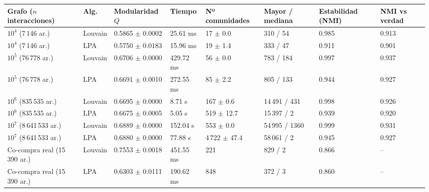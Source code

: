\setlength{\tabcolsep}{4pt}
\begin{tabular}{@{}llllllll@{}}\toprule
Grafo ($n$ interacciones) & Alg. & Modularidad $Q$ & Tiempo & Nº comunidades & Mayor / mediana & Estabilidad (NMI) & NMI vs verdad \\\midrule
$10^4$ (7\,146 ar.) & Louvain & 0.5865 $\pm$ 0.0002 & 25.61 ms & 17 $\pm$ 0.0 & 310 / 54 & 0.985 & 0.913 \\
$10^4$ (7\,146 ar.) & LPA & 0.5750 $\pm$ 0.0183 & 15.96 ms & 19 $\pm$ 1.4 & 333 / 47 & 0.911 & 0.901 \\
$10^5$ (76\,778 ar.) & Louvain & 0.6706 $\pm$ 0.0000 & 429.72 ms & 56 $\pm$ 0.0 & 783 / 184 & 0.997 & 0.937 \\
$10^5$ (76\,778 ar.) & LPA & 0.6691 $\pm$ 0.0010 & 272.55 ms & 85 $\pm$ 2.2 & 805 / 133 & 0.944 & 0.927 \\
$10^6$ (835\,535 ar.) & Louvain & 0.6695 $\pm$ 0.0000 & 8.71 s & 167 $\pm$ 0.6 & 14\,491 / 431 & 0.998 & 0.926 \\
$10^6$ (835\,535 ar.) & LPA & 0.6675 $\pm$ 0.0005 & 5.05 s & 519 $\pm$ 12.7 & 15\,397 / 2 & 0.939 & 0.920 \\
$10^7$ (8\,641\,533 ar.) & Louvain & 0.6889 $\pm$ 0.0000 & 152.04 s & 553 $\pm$ 0.0 & 54\,995 / 1360 & 0.999 & 0.931 \\
$10^7$ (8\,641\,533 ar.) & LPA & 0.6880 $\pm$ 0.0000 & 77.88 s & 4\,722 $\pm$ 47.4 & 58\,061 / 2 & 0.945 & 0.927 \\
Co-compra real (15\,390 ar.) & Louvain & 0.7553 $\pm$ 0.0018 & 451.55 ms & 221 & 829 / 2 & 0.866 & -- \\
Co-compra real (15\,390 ar.) & LPA & 0.6303 $\pm$ 0.0111 & 190.62 ms & 848 & 372 / 3 & 0.860 & -- \\
\bottomrule\end{tabular}